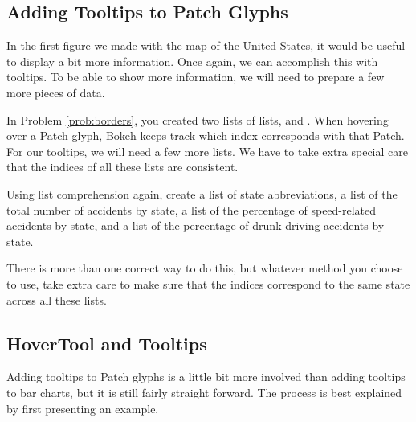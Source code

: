 \subsection*{Adding Tooltips to Patch Glyphs}
In the first figure we made with the map of the United States, it would be useful
to display a bit more information. Once again, we can accomplish this with
tooltips. To be able to show more information, we will need to prepare a few more
pieces of data.

\begin{problem} \label{prob:lists}
In Problem \ref{prob:borders}, you created two lists of lists,  and
. When hovering over a Patch glyph, Bokeh keeps track which index
corresponds with that Patch. For our tooltips, we will need a few more lists. We
have to take extra special care that the indices of all these lists are
consistent.

Using list comprehension again, create a list of state abbreviations, a list of
the total number of accidents by state, a list of the percentage of speed-related
accidents by state, and a list of the percentage of drunk driving accidents by
state.

There is more than one correct way to do this, but whatever method you choose to use, take extra care to make
sure that the indices correspond to the same state across all these lists.
\end{problem}

\subsection*{HoverTool and Tooltips}
Adding tooltips to Patch glyphs is a little bit more involved than adding tooltips
to bar charts, but it is still fairly straight forward. The process is best
explained by first presenting an example.

